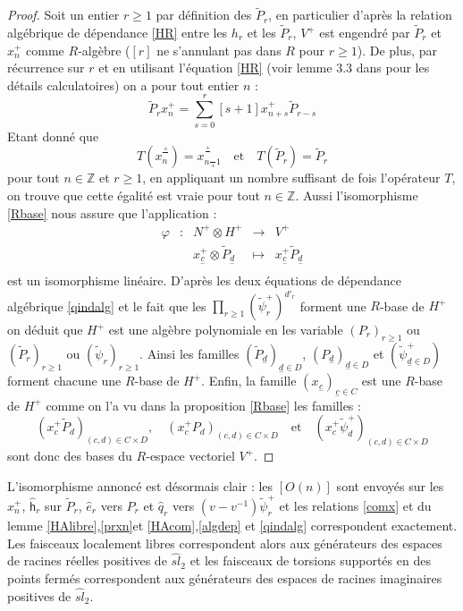 \documentclass[12pt]{article}
\theoremstyle{definition}
\begin{document}
\begin{proof} Soit un entier $r\geq 1$ par définition des $\widetilde{P}_{r}$, en particulier d'après la relation algébrique de dépendance \ref{HR} entre les $h_r$ et les $\widetilde{P}_r$, $V^+$ est engendré par $\widetilde{P}_{r}$ et $x_n^+$ comme $R$-algèbre ($[r]$ ne s'annulant pas dans $R$ pour $r\geq 1$). De plus, par récurrence sur $r$ et en utilisant l'équation \ref{HR} (voir lemme 3.3 dans \cite{ChariP} pour les détails calculatoires) on a pour tout entier $n$ :\begin{equation}\label{prxn}
\widetilde{P}_rx_n^+=\underset{s=0}{\overset{r}{\sum}}[s+1]x_{n+s}^+\widetilde{P}_{r-s}
\end{equation} Etant donné que $$ T(x_n^{\frac{+}{}})=x^{\frac{+}{}}_{n\frac{}{+}1}\quad\mbox{et}\quad T(\widetilde{P}_r)=\widetilde{P}_r$$ pour tout $n\in\mathbb{Z}$ et $r\geq 1$, en appliquant un nombre suffisant de fois l'opérateur $T$, on trouve que cette égalité est vraie pour tout  $n\in\mathbb{Z}$. Aussi l'isomorphisme \ref{Rbase}  nous assure que l'application : $$\begin{array}{ccccc}
\varphi & : & N^+\otimes H^+ & \to & V^+ \\
 & & x_{\underset{-}{c}}^+\otimes \widetilde{P}_{\underset{-}{d}} & \mapsto & x_{\underset{-}{c}}^+\widetilde{P}_{\underset{-}{d}} \\
\end{array}$$ est un isomorphisme linéaire. D'après les deux équations de dépendance algébrique \ref{qindalg} et le fait que les  $\underset{r\geqslant 1}{\prod}(\widetilde{\psi}^{+}_{r})^{d'_r}$ forment une $R$-base de $H^+$ on déduit que $H^+$ est une algèbre polynomiale en les variable $(P_r)_{r\geq 1}$ ou $(\widetilde{P}_r)_{r\geq 1}$ ou $(\widetilde{\psi}_r)_{r\geq 1}$. Ainsi les familles $(\widetilde{P}_{\underset{-}{d}})_{\underset{-}{d}\in D}$, $(P_{\underset{-}{d}})_{\underset{-}{d}\in D}$ et $(\widetilde{\psi}^+_{\underset{-}{d}\in D})$ forment chacune une $R$-base de $H^+$. Enfin, la famille $(x_{\underset{-}{c}})_{{\underset{-}{c}\in C}}$ est une $R$-base de $H^+$ comme on l'a vu dans la proposition \ref{Rbase} les familles : $$(x_c^+\tilde{P}_d)_{(c,d)\in C\times D},\quad (x_c^+ P_d)_{(c,d)\in C\times D}\quad\mbox{et}\quad(x_c^+\tilde{\psi}_d^+)_{(c,d)\in C\times D}$$ sont donc des bases du $R$-espace vectoriel $V^+$.
\end{proof}
\vspace{1cm}
L'isomorphisme annoncé est désormais clair : les $[O(n)]$ sont envoyés sur les $x_n^+$, $\hat{\mathsf{h}}_r$ sur $\tilde{P}_r$, $\hat{e}_r$ vers $P_r$ et $\hat{q}_r$ vers $(v-v^{-1})\tilde{\psi}_r^+$ et  les relations \ref{comx} et du lemme \ref{HAlibre},\ref{prxn}et \ref{HAcom},\ref{algdep} et \ref{qindalg} correspondent exactement. Les faisceaux localement libres correspondent alors aux générateurs des espaces de racines réelles positives de $\widehat{sl}_2$ et les faisceaux de torsions supportés en des points fermés correspondent aux générateurs des espaces de racines imaginaires positives  de $\widehat{sl}_2$.
\end{document}

